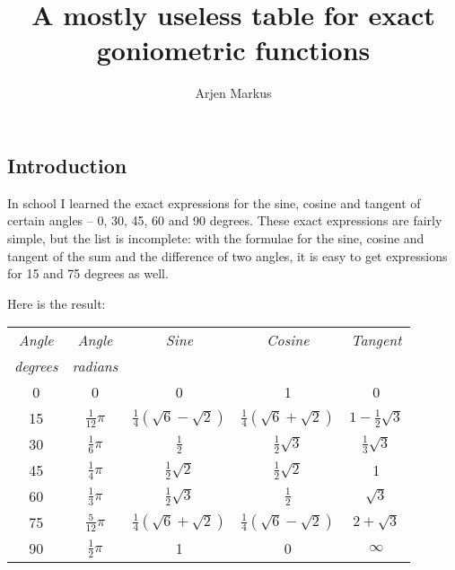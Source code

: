 \documentclass[onecolumn]{article}
\begin{document}
\title{A mostly useless table for exact goniometric functions}

\author{Arjen Markus}

\maketitle

\subsection*{Introduction}
In school I learned the exact expressions for the sine, cosine and tangent
of certain angles -- 0, 30, 45, 60 and 90 degrees. These exact expressions
are fairly simple, but the list is incomplete: with the formulae for the
sine, cosine and tangent of the sum and the difference of two angles, it is easy
to get expressions for 15 and 75 degrees as well.

Here is the result:

\vspace{\baselineskip}
\begin{tabular}{ccccc}
\emph{Angle}     & \emph{Angle}          & \emph{Sine}                          & \emph{Cosine}                        & \emph{Tangent}              \\
\emph{degrees}   & \emph{radians}        &                                      &                                      &                             \\
\hline
   0             &     0                 &     0                                &     1                                &     0                       \\
  15             &  $\frac{1}{12} \pi$   &   $\frac{1}{4}(\sqrt{6} - \sqrt{2})$ &  $\frac{1}{4}(\sqrt{6} + \sqrt{2})$  &  $1 - \frac{1}{2} \sqrt{3}$ \\
  30             &  $\frac{1}{6} \pi$    &   $\frac{1}{2}$                      & $\frac{1}{2} \sqrt{3}$               &  $\frac{1}{3} \sqrt{3}$     \\
  45             &  $\frac{1}{4} \pi$    &   $\frac{1}{2} \sqrt{2}$             & $\frac{1}{2} \sqrt{2}$               &     1                       \\
  60             &  $\frac{1}{3} \pi$    &   $\frac{1}{2} \sqrt{3}$             & $\frac{1}{2}$                        &  $\sqrt{3}$                 \\
  75             &  $\frac{5}{12} \pi$   &   $\frac{1}{4}(\sqrt{6} + \sqrt{2})$ &  $\frac{1}{4}(\sqrt{6} - \sqrt{2})$  &  $2 + \sqrt{3}$             \\
  90             &  $\frac{1}{2} \pi$    &     1                                &     0                                &  $\infty$                   \\
\hline
\end{tabular}
\vspace{\baselineskip}
\end{document}

